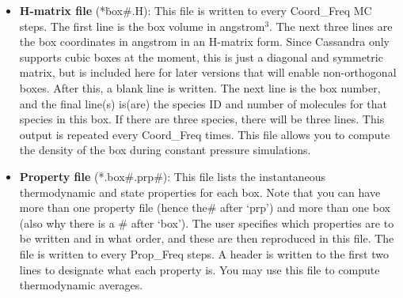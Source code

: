 \begin{itemize}
\item {\bf H-matrix file} (*\.box\#.H): This file is written to every Coord\_Freq MC steps. The first line is the box volume in angstrom$^3$. The next three lines are the box coordinates in angstrom in an H-matrix form. Since Cassandra only supports cubic boxes at the moment, this is just a diagonal and symmetric matrix, but is included here for later versions that will enable non-orthogonal boxes. After this, a blank line is written. The next line is the box number, and the final line(s) is(are) the species ID and number of molecules for that species in this box. If there are three species, there will be three lines. This output is repeated every Coord\_Freq times. This file allows you to compute the density of the box during constant pressure simulations.  


\item{{\bf Property file}} (*.box\#.prp\#): This file lists the instantaneous thermodynamic and state properties for each box. Note that you can have more than one property file (hence the\# after `prp') and more than one box (also why there is a \# after `box'). The user specifies which properties are to be written and in what order, and these are then reproduced in this file. The file is written to every Prop\_Freq steps. A header is written to the first two lines to designate what each property is. You may use this file to compute thermodynamic averages.

\end{itemize}
